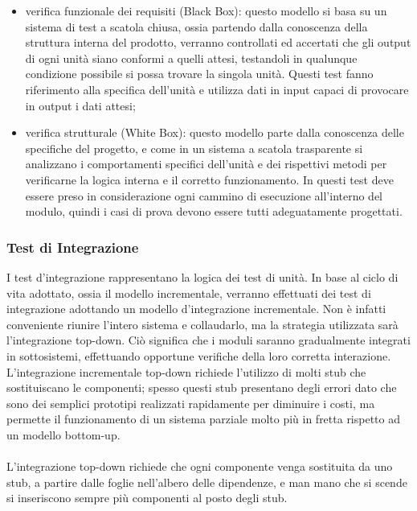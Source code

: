\begin{itemize}
  \item verifica funzionale dei requisiti (Black Box): questo modello si basa su
  un sistema di test a scatola chiusa, ossia partendo dalla conoscenza della struttura interna del 
prodotto, verranno controllati ed accertati che gli output di ogni unit\`a siano  conformi 
a quelli attesi, testandoli in qualunque condizione possibile si possa trovare la singola 
unit\`a. Questi test fanno riferimento alla specifica dell'unit\`a e utilizza
dati in input capaci di provocare in output i dati attesi;
  \item verifica strutturale (White Box): questo modello parte dalla conoscenza 
  delle specifiche del progetto, e come in un sistema a scatola trasparente si analizzano i 
comportamenti specifici dell'unit\`a e dei rispettivi metodi per verificarne la logica 
interna e il corretto funzionamento. In questi test deve essere preso in considerazione 
ogni cammino di esecuzione all'interno del modulo, quindi i casi di prova devono essere 
tutti adeguatamente progettati. 
\end{itemize}


\subsubsection*{Test di Integrazione}
I test d'integrazione rappresentano la logica dei test di unit\`a.
In base al ciclo di vita adottato, ossia il modello incrementale, verranno effettuati dei 
test di integrazione adottando un modello d'integrazione incrementale. 
Non \`e infatti conveniente riunire l'intero sistema e collaudarlo, ma la
strategia utilizzata sar\`a l'integrazione top-down. Ci\`o significa che i
moduli saranno gradualmente integrati in sottosistemi, effettuando opportune verifiche della loro  corretta interazione. 
L'integrazione incrementale top-down richiede l'utilizzo di molti stub che
sostituiscano le componenti; spesso questi stub presentano degli errori dato che sono dei semplici 
prototipi realizzati rapidamente per diminuire i costi, ma permette il funzionamento di 
un sistema parziale molto pi\`u in fretta rispetto ad un modello bottom-up.\\
\\
L'integrazione top-down richiede che ogni componente venga sostituita da uno
stub, a partire dalle foglie nell'albero delle dipendenze, e man mano che si scende si 
inseriscono sempre pi\`u componenti al posto degli stub.


